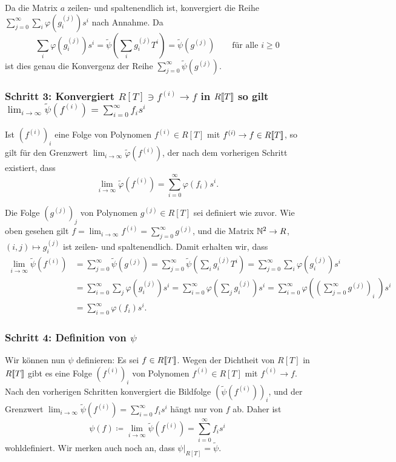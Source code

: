 \documentclass[a4paper, 10pt, numbers=noenddot]{scrartcl}
\begin{document}
Da die Matrix $a$ zeilen- und spaltenendlich ist, konvergiert die Reihe $\sum_{j=0}^\infty \sum_i \varphi( g^{(j)}_i ) s^i$ nach Annahme.
Da
\[
    \sum_i \varphi\left( g^{(j)}_i \right) s^i
  = \tilde{\psi}\left( \sum_i g^{(j)}_i T^i \right)
  = \tilde{\psi}\left( g^{(j)} \right)
  \qquad
  \text{für alle $i \geq 0$}
\]
ist dies genau die Konvergenz der Reihe $\sum_{j=0}^\infty \tilde{\psi}(g^{(j)})$.


\subsubsection*{Schritt 3: Konvergiert $R[T] \ni f^{(i)} \to f$ in $R[\![T]\!]$ so gilt $\lim_{i \to \infty} \tilde{\psi}(f^{(i)}) = \sum_{i=0}^\infty f_i s^i$}
Ist $(f^{(i)})_i$ eine Folge von Polynomen $f^{(i)} \in R[T]$ mit $f^{(i)} \to f \in R[\![T]\!]$, so gilt für den Grenzwert $\lim_{i \to \infty} \tilde{\varphi}(f^{(i)})$, der nach dem vorherigen Schritt existiert, dass
\[
    \lim_{i \to \infty} \tilde{\varphi}\left( f^{(i)} \right)
  = \sum_{i=0}^\infty \varphi(f_i) s^i.
\]

Die Folge $(g^{(j)})_j$ von Polynomen $g^{(j)} \in R[T]$ sei definiert wie zuvor.
Wie oben gesehen gilt $f = \lim_{i \to \infty} f^{(i)} = \sum_{j=0}^\infty g^{(j)}$, und die Matrix $\mathbb{N}^2 \to R$, $(i,j) \mapsto g^{(j)}_i$ ist zeilen- und spaltenendlich.
Damit erhalten wir, dass
\begin{align*}
    \lim_{i \to \infty} \tilde{\psi}\left( f^{(i)} \right)
  &= \sum_{j=0}^\infty \tilde{\psi}\left( g^{(j)} \right)
   = \sum_{j=0}^\infty \tilde{\psi}\left( \sum_i g^{(j)}_i T^i \right)
   = \sum_{j=0}^\infty \sum_i \varphi\left( g^{(j)}_i \right) s^i
  \\
  &= \sum_{i=0}^\infty \sum_j \varphi\left( g^{(j)}_i \right) s^i
   = \sum_{i=0}^\infty \varphi\left( \sum_j g^{(j)}_i \right) s^i
   = \sum_{i=0}^\infty \varphi\left( \left( \sum_{j=0}^\infty g^{(j)} \right)_{\!\!\!i}\; \right) s^i
  \\
  &= \sum_{i=0}^\infty \varphi(f_i) s^i.
\end{align*}


\subsubsection*{Schritt 4: Definition von $\psi$}
Wir können nun $\psi$ definieren:
Es sei $f \in R[\![T]\!]$.
Wegen der Dichtheit von $R[T]$ in $R[\![T]\!]$ gibt es eine Folge $(f^{(i)})_i$ von Polynomen $f^{(i)} \in R[T]$ mit $f^{(i)} \to f$.
Nach den vorherigen Schritten konvergiert die Bildfolge $(\tilde{\psi}(f^{(i)}))_i$, und der Grenzwert $\lim_{i \to \infty} \tilde{\psi}(f^{(i)}) = \sum_{i=0}^\infty f_i s^i$ hängt nur von $f$ ab.
Daher ist
\[
            \psi(f)
  \coloneqq \lim_{i \to \infty} \tilde{\psi}\left( f^{(i)} \right)
  =         \sum_{i=0}^\infty f_i s^i
\]
wohldefiniert.
Wir merken auch noch an, dass $\psi|_{R[T]} = \tilde{\psi}$.
\end{document}

